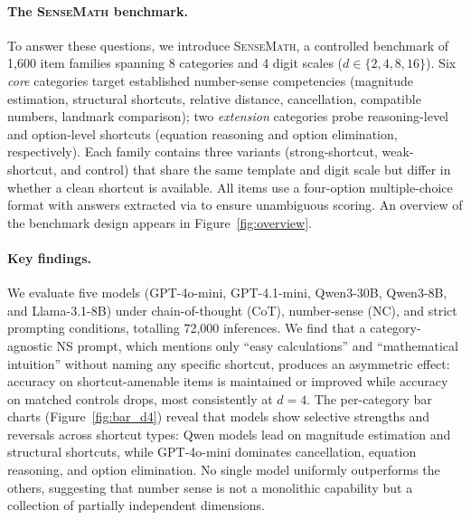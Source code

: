 \paragraph{The \textsc{SenseMath} benchmark.}
To answer these questions, we introduce \textsc{SenseMath}, a controlled benchmark of 1{,}600 item families spanning 8 categories and 4 digit scales ($d \in \{2, 4, 8, 16\}$).
Six \emph{core} categories target established number-sense competencies (magnitude estimation, structural shortcuts, relative distance, cancellation, compatible numbers, landmark comparison); two \emph{extension} categories probe reasoning-level and option-level shortcuts (equation reasoning and option elimination, respectively).
Each family contains three variants (strong-shortcut, weak-shortcut, and control) that share the same template and digit scale but differ in whether a clean shortcut is available.
All items use a four-option multiple-choice format with answers extracted via \boxed{} to ensure unambiguous scoring.
An overview of the benchmark design appears in Figure~\ref{fig:overview}.

\paragraph{Key findings.}
We evaluate five models (GPT-4o-mini, GPT-4.1-mini, Qwen3-30B, Qwen3-8B, and Llama-3.1-8B) under chain-of-thought (CoT), number-sense (NC), and strict prompting conditions, totalling 72{,}000 inferences.
We find that a category-agnostic NS prompt, which mentions only ``easy calculations'' and ``mathematical intuition'' without naming any specific shortcut, produces an asymmetric effect: accuracy on shortcut-amenable items is maintained or improved while accuracy on matched controls drops, most consistently at $d{=}4$.
The per-category bar charts (Figure~\ref{fig:bar_d4}) reveal that models show selective strengths and reversals across shortcut types: Qwen models lead on magnitude estimation and structural shortcuts, while GPT-4o-mini dominates cancellation, equation reasoning, and option elimination.
No single model uniformly outperforms the others, suggesting that number sense is not a monolithic capability but a collection of partially independent dimensions.

